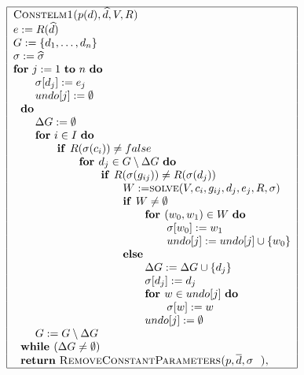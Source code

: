 \documentclass{article}
\begin{document}
\[
\begin{tabular}{|l|}
\hline
\textsc{Constelm1(}$p(d),\widehat{d},V,R$\textsc{)} \\ 
$e:=R(\widehat{d})$ \\ 
$G:=\{d_{1},\ldots ,d_{n}\}$ \\ 
$\sigma :=\widehat{\sigma }$ \\ 
\textbf{for} $j:=1$ \textbf{to} $n$ \textbf{do} \\ 
$\qquad \sigma \lbrack d_{j}]:=e_{j}$ \\ 
$\qquad undo[j]:=\emptyset $ \\ 
$\text{\textbf{do}}$ \\ 
$\qquad \Delta G:=\emptyset $ \\ 
$\qquad $\textbf{for} $i\in I$ \textbf{do} \\ 
$\qquad \qquad $\textbf{if }$R(\sigma (c_{i}))\neq false$ \\ 
$\qquad \qquad \qquad $\textbf{for }$d_{j}\in G\setminus \Delta G$ \textbf{do%
} \\ 
$\qquad \qquad \qquad \qquad $\textbf{if }$R(\sigma (g_{ij}))\neq R(\sigma
(d_{j}))$ \\ 
$\qquad \qquad \qquad \qquad \qquad W:=$\textsc{solve}$%
(V,c_{i},g_{ij},d_{j},e_{j},R,\sigma )$ \\ 
$\qquad \qquad \qquad \qquad \qquad $\textbf{if }$W\neq \emptyset $ \\ 
$\qquad \qquad \qquad \qquad \qquad \qquad $\textbf{for }$(w_{0},w_{1})\in W$
\textbf{do} \\ 
$\qquad \qquad \qquad \qquad \qquad \qquad \qquad \sigma \lbrack
w_{0}]:=w_{1}$ \\ 
$\qquad \qquad \qquad \qquad \qquad \qquad \qquad undo[j]:=undo[j]\cup
\{w_{0}\}$ \\ 
$\qquad \qquad \qquad \qquad \qquad $\textbf{else} \\ 
$\qquad \qquad \qquad \qquad \qquad \qquad \Delta G:=\Delta G\cup \{d_{j}\}$
\\ 
$\qquad \qquad \qquad \qquad \qquad \qquad \sigma \lbrack d_{j}]:=d_{j}$ \\ 
$\qquad \qquad \qquad \qquad \qquad \qquad $\textbf{for }$w\in undo[j]$ 
\textbf{do} \\ 
$\qquad \qquad \qquad \qquad \qquad \qquad \qquad \sigma \lbrack w]:=w$ \\ 
$\qquad \qquad \qquad \qquad \qquad \qquad undo[j]:=\emptyset $ \\ 
$\qquad G:=G\setminus \Delta G$ \\ 
$\text{\textbf{while }}(\Delta G\neq \emptyset )$ \\ 
$\text{\textbf{return} \textsc{RemoveConstantParameters(}}p,\overline{d}%
,\sigma \text{\textsc{)}},$ \\ \hline
\end{tabular}%
\]%
\end{document}
